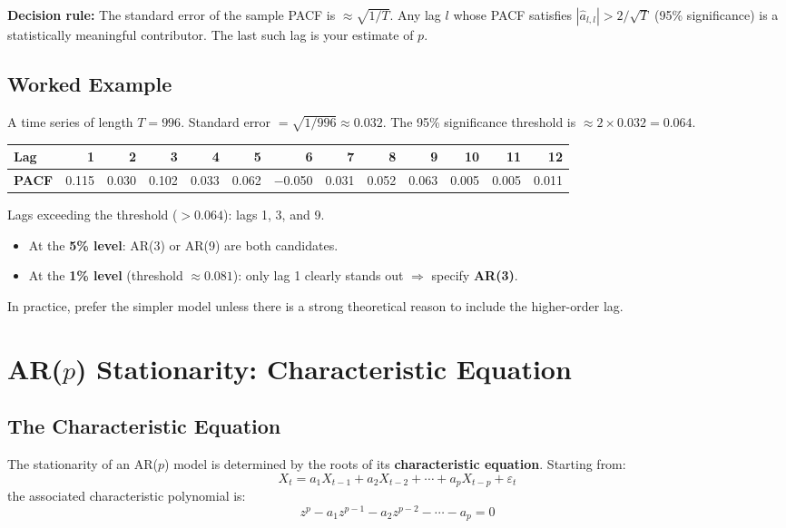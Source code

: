 \documentclass[11pt]{article}
\begin{document}
\textbf{Decision rule:} The standard error of the sample PACF is $\approx
\sqrt{1/T}$. Any lag $l$ whose PACF satisfies $|\hat{a}_{l,l}| > 2/\sqrt{T}$
(95\% significance) is a statistically meaningful contributor. The last such lag
is your estimate of $p$.

\subsection{Worked Example}
A time series of length $T = 996$. Standard error $= \sqrt{1/996} \approx 0.032$.
The 95\% significance threshold is $\approx 2 \times 0.032 = 0.064$.

\begin{center}
\begin{tabular}{@{}lrrrrrrrrrrrr@{}}
\toprule
\textbf{Lag}  & 1 & 2 & 3 & 4 & 5 & 6 & 7 & 8 & 9 & 10 & 11 & 12 \\
\midrule
\textbf{PACF} & 0.115 & 0.030 & 0.102 & 0.033 & 0.062 & $-$0.050
              & 0.031 & 0.052 & 0.063 & 0.005 & 0.005 & 0.011 \\
\bottomrule
\end{tabular}
\end{center}

Lags exceeding the threshold ($>0.064$): lags 1, 3, and 9.
\begin{itemize}
    \item At the \textbf{5\% level}: AR(3) or AR(9) are both candidates.
    \item At the \textbf{1\% level} (threshold $\approx 0.081$): only lag 1 clearly
      stands out $\Rightarrow$ specify \textbf{AR(3)}.
\end{itemize}

In practice, prefer the simpler model unless there is a strong theoretical reason
to include the higher-order lag.


\section{AR($p$) Stationarity: Characteristic Equation}

\subsection{The Characteristic Equation}
The stationarity of an AR($p$) model is determined by the roots of its
\textbf{characteristic equation}. Starting from:
\[
X_t = a_1 X_{t-1} + a_2 X_{t-2} + \cdots + a_p X_{t-p} + \varepsilon_t
\]
the associated characteristic polynomial is:
\[
z^p - a_1 z^{p-1} - a_2 z^{p-2} - \cdots - a_p = 0
\]
\end{document}
